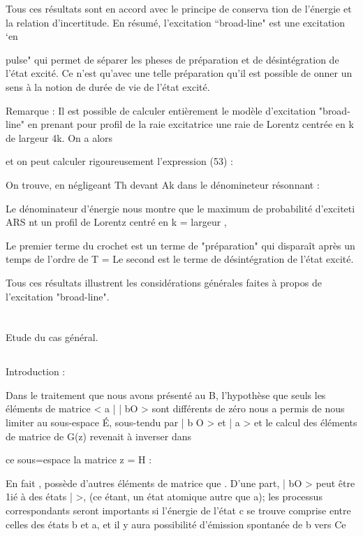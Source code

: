 Tous ces résultats sont en accord avec le principe de conserva
tion de l'énergie et la relation d'incertitude.
En résumé, l'excitation “broad-line" est une excitation ‘en

pulse" qui permet de séparer les pheses de préparation et de désintégration de
l'état excité. Ce n'est qu'avec une telle préparation qu'il est possible de onner un sens à la notion de durée de vie de l'état excité.

Remarque : Il est possible de calculer entièrement le modèle d'excitation "broad-line"
en prenant pour profil de la raie excitatrice une raie de Lorentz centrée en k
de largeur 4k. On a alors

et on peut calculer rigoureusement l'expression (53) :

On trouve, en négligeant Th devant Ak dans le dénomineteur résonnant :


Le dénominateur d'énergie nous montre que le maximum de probabilité d'exciteti ARS nt un profil de Lorentz centré en k = 
largeur ,

Le premier terme du crochet est un terme de "préparation" qui
disparaît après un temps de l'ordre de T =  Le second est le terme de
désintégration de l'état excité.

Tous ces résultats illustrent les considérations générales faites à propos de l'excitation "broad-line".

\section{} Etude du cas général.%
\subsection{} Introduction :%

Dans le traitement que nous avons présenté au  B, l'hypothèse
que seuls les éléments de matrice < a | | bO > sont différents de zéro
nous a permis de nous limiter au sous-espace É, sous-tendu par | b O > et
| a > et le calcul des éléments de matrice de G(z) revenait à inverser dans

ce sous=espace la matrice z = H :

En fait , possède d'autres éléments de matrice que
.
D'une part, | bO > peut être 1ié à des états |  >, (ce étant,
un état atomique autre que a); les processus correspondants seront importants
si l'énergie de l'état c se trouve comprise entre celles des états b et a, et
il y aura possibilité d'émission spontanée de b vers Ce

